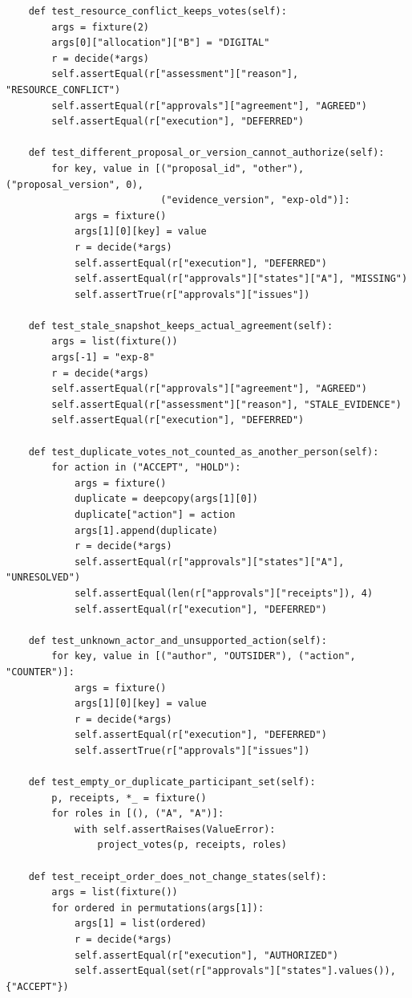 \documentclass[10pt,a4paper]{article}
\begin{document}
\begin{verbatim}
    def test_resource_conflict_keeps_votes(self):
        args = fixture(2)
        args[0]["allocation"]["B"] = "DIGITAL"
        r = decide(*args)
        self.assertEqual(r["assessment"]["reason"], "RESOURCE_CONFLICT")
        self.assertEqual(r["approvals"]["agreement"], "AGREED")
        self.assertEqual(r["execution"], "DEFERRED")

    def test_different_proposal_or_version_cannot_authorize(self):
        for key, value in [("proposal_id", "other"), ("proposal_version", 0),
                           ("evidence_version", "exp-old")]:
            args = fixture()
            args[1][0][key] = value
            r = decide(*args)
            self.assertEqual(r["execution"], "DEFERRED")
            self.assertEqual(r["approvals"]["states"]["A"], "MISSING")
            self.assertTrue(r["approvals"]["issues"])

    def test_stale_snapshot_keeps_actual_agreement(self):
        args = list(fixture())
        args[-1] = "exp-8"
        r = decide(*args)
        self.assertEqual(r["approvals"]["agreement"], "AGREED")
        self.assertEqual(r["assessment"]["reason"], "STALE_EVIDENCE")
        self.assertEqual(r["execution"], "DEFERRED")

    def test_duplicate_votes_not_counted_as_another_person(self):
        for action in ("ACCEPT", "HOLD"):
            args = fixture()
            duplicate = deepcopy(args[1][0])
            duplicate["action"] = action
            args[1].append(duplicate)
            r = decide(*args)
            self.assertEqual(r["approvals"]["states"]["A"], "UNRESOLVED")
            self.assertEqual(len(r["approvals"]["receipts"]), 4)
            self.assertEqual(r["execution"], "DEFERRED")

    def test_unknown_actor_and_unsupported_action(self):
        for key, value in [("author", "OUTSIDER"), ("action", "COUNTER")]:
            args = fixture()
            args[1][0][key] = value
            r = decide(*args)
            self.assertEqual(r["execution"], "DEFERRED")
            self.assertTrue(r["approvals"]["issues"])

    def test_empty_or_duplicate_participant_set(self):
        p, receipts, *_ = fixture()
        for roles in [(), ("A", "A")]:
            with self.assertRaises(ValueError):
                project_votes(p, receipts, roles)

    def test_receipt_order_does_not_change_states(self):
        args = list(fixture())
        for ordered in permutations(args[1]):
            args[1] = list(ordered)
            r = decide(*args)
            self.assertEqual(r["execution"], "AUTHORIZED")
            self.assertEqual(set(r["approvals"]["states"].values()), {"ACCEPT"})


\end{verbatim}
\end{document}
